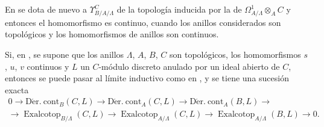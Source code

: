 \begin{env}[20.7.12]
\label{0.20.7.12-fr}
En  se dota de nuevo a $\Upsilon^C_{B/A/\Lambda}$ de la
topología inducida por la de $\Omega^1_{A/\Lambda}\otimes_A C$ y entonces
el homomorfismo  es continuo, cuando los anillos
considerados son topológicos y los homomorfismos de anillos son continuos.
\end{env}

\begin{env}[20.7.13]
\label{0.20.7.13-fr}
Si, en , se supone que los anillos $\Lambda$, $A$, $B$,
$C$ son topológicos, los homomorfismos $s$, $u$, $v$ continuos y $L$ un
$C$-módulo discreto anulado por un ideal abierto de $C$, entonces se puede pasar
al límite inductivo como en , y se tiene una sucesión exacta
\begin{equation}
\tag{20.7.13.1}
\label{0.20.7.13.1-fr}
\begin{split}
  0\to\operatorname{D\acute{e}r.\ cont}_B(C,L)\to
  \operatorname{D\acute{e}r.\ cont}_A(C,L)\to
  \operatorname{D\acute{e}r.\ cont}_A(B,L)\to \\
  \to\operatorname{Exalcotop}_{B/\Lambda}(C,L)\to
  \operatorname{Exalcotop}_{A/\Lambda}(C,L)\to
  \operatorname{Exalcotop}_{A/\Lambda}(B,L)\to0.
\end{split}
\end{equation}
\end{env}


